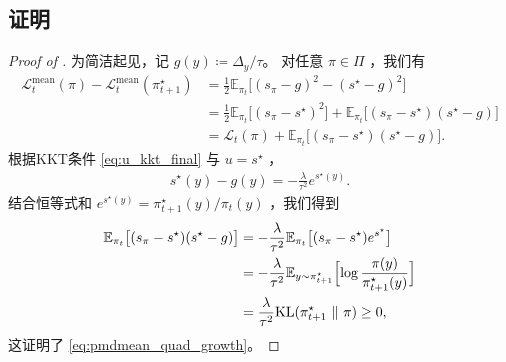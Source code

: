 \documentclass{article}
\theoremstyle{plain}
\theoremstyle{definition}
\theoremstyle{remark}
\newcommand{\KL}{\mathrm{KL}}
\newcommand{\E}{\mathbb{E}}
\begin{document}
\subsection{证明 }
\label{sec:proof_pmdmean_quad_growth}

\begin{proof}[Proof of ]
    为简洁起见，记 $g(y)\coloneqq \Delta_y/\tau$。
    对任意 $\pi\in\Pi$ ，我们有
    \begin{align*}
        \mathcal{L}^{\mathrm{mean}}_t(\pi)-\mathcal{L}^{\mathrm{mean}}_t(\pi^\star_{t+1})
        &=\frac{1}{2}\E_{\pi_t}\big[(s_\pi-g)^2-(s^\star-g)^2\big]\\
        &=\frac{1}{2}\E_{\pi_t}\big[(s_\pi-s^\star)^2\big]
        +\E_{\pi_t}\big[(s_\pi-s^\star)(s^\star-g)\big]\\
        &=\mathcal{L}_t(\pi)+\E_{\pi_t}\big[(s_\pi-s^\star)(s^\star-g)\big].
    \end{align*}
    根据KKT条件 \eqref{eq:u_kkt_final} 与 $u=s^\star$ ，
    \begin{align*}
        s^\star(y)-g(y)=-\frac{\lambda}{\tau^2}e^{s^\star(y)}.
    \end{align*}
    结合恒等式和 $e^{s^\star(y)}=\pi^\star_{t+1}(y)/\pi_t(y)$ ，我们得到
    \begin{align*}
        \E_{\pi_t}\big[(s_\pi-s^\star)(s^\star-g)\big]
        &=-\frac{\lambda}{\tau^2}\E_{\pi_t}\big[(s_\pi-s^\star)e^{s^\star}\big]\\
        &=-\frac{\lambda}{\tau^2}\E_{y\sim\pi^\star_{t+1}}\Bigl[\log\frac{\pi(y)}{\pi^\star_{t+1}(y)}\Bigr]\\
        &=\frac{\lambda}{\tau^2}\KL(\pi^\star_{t+1}~\|~\pi)
        \geq 0,
    \end{align*}
    这证明了 \eqref{eq:pmdmean_quad_growth}。
\end{proof}
\end{document}
